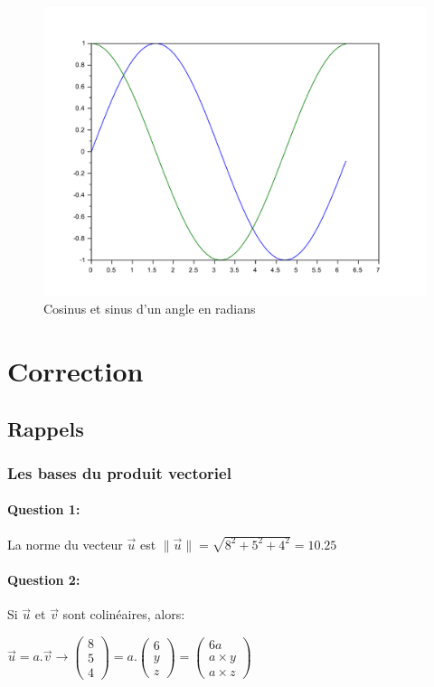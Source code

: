 \begin{figure}[!h]
	\begin{center}
	\includegraphics[width=0.7\linewidth]{img/Radians}
	\end{center}
	\caption{Cosinus et sinus d'un angle en radians}
\end{figure}

\ifdef{\public}{}

\newpage

\pagestyle{correction}

\section{Correction}

\subsection{Rappels}

\subsubsection{Les bases du produit vectoriel}

\paragraph{Question 1:} La norme du vecteur $\overrightarrow{u}$ est $\|\overrightarrow{u}\|=\sqrt{8^2+5^2+4^2}=10.25$

\paragraph{Question 2:} Si $\overrightarrow{u}$ et $\overrightarrow{v}$ sont colinéaires, alors: 

$\overrightarrow{u}=a.\overrightarrow{v}\rightarrow \left(\begin{array}{c}8 \\ 5 \\ 4 \end{array}\right)=a.\left(\begin{array}{c}6 \\ y \\ z \end{array}\right)=\left(\begin{array}{c} 6a \\ a\times y \\ a\times z \end{array}\right)$

